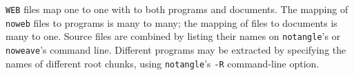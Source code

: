 

{\tt WEB} files map one to one with to both programs and documents.
The mapping of \verb+noweb+ files to programs is many to many; the
mapping of files to documents is many to one.
Source files are combined by listing their names on \verb+notangle+'s
or \verb+noweave+'s command line.
Different programs may be extracted by specifying the names
of different root chunks, using \verb+notangle+'s \verb+-R+ command-line
option.


